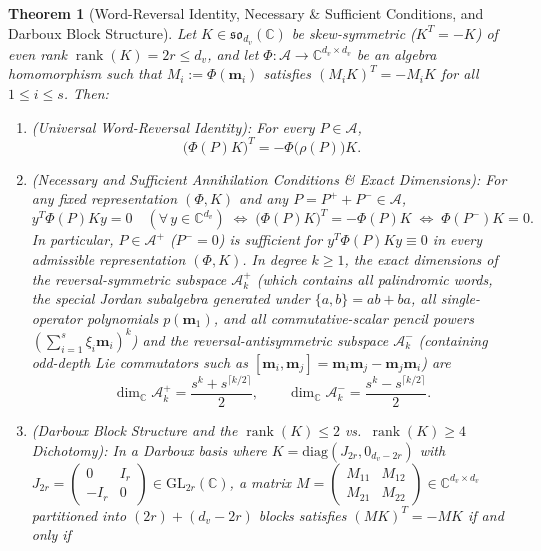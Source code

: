 \documentclass[11pt,a4paper]{article}
\newtheorem{theorem}{Theorem}[section]
\theoremstyle{definition}
\DeclareMathOperator{\rank}{rank}
\begin{document}
\begin{theorem}[Word-Reversal Identity, Necessary \& Sufficient Conditions, and Darboux Block Structure]\label{thm:wordreversal}
Let $K \in \mathfrak{so}_{d_v}(\mathbb{C})$ be skew-symmetric ($K^T = -K$) of even rank $\rank(K) = 2r \le d_v$, and let $\Phi : \mathcal{A} \to \mathbb{C}^{d_v \times d_v}$ be an algebra homomorphism such that $M_i := \Phi(\mathbf{m}_i)$ satisfies $(M_i K)^T = -M_i K$ for all $1 \le i \le s$. Then:
\begin{enumerate}
  \item \emph{(Universal Word-Reversal Identity):} For every $P \in \mathcal{A}$,
  \[
    \big(\Phi(P) K\big)^T = -\Phi\big(\rho(P)\big) K.
  \]
  \item \emph{(Necessary and Sufficient Annihilation Conditions \& Exact Dimensions):} For any fixed representation $(\Phi, K)$ and any $P = P^+ + P^- \in \mathcal{A}$,
  \[
    y^T \Phi(P) K y = 0 \quad (\forall\, y \in \mathbb{C}^{d_v})
    \;\Longleftrightarrow\;
    \big(\Phi(P) K\big)^T = -\Phi(P) K
    \;\Longleftrightarrow\;
    \Phi(P^-) K = 0.
  \]
  In particular, $P \in \mathcal{A}^+$ ($P^- = 0$) is sufficient for $y^T \Phi(P) K y \equiv 0$ in every admissible representation $(\Phi, K)$. In degree $k \ge 1$, the exact dimensions of the reversal-symmetric subspace $\mathcal{A}_k^+$ (which contains all palindromic words, the special Jordan subalgebra generated under $\{a,b\} = ab+ba$, all single-operator polynomials $p(\mathbf{m}_1)$, and all commutative-scalar pencil powers $(\sum_{i=1}^s \xi_i \mathbf{m}_i)^k$) and the reversal-antisymmetric subspace $\mathcal{A}_k^-$ (containing odd-depth Lie commutators such as $[\mathbf{m}_i, \mathbf{m}_j] = \mathbf{m}_i\mathbf{m}_j - \mathbf{m}_j\mathbf{m}_i$) are
  \[
    \dim_{\mathbb{C}} \mathcal{A}_k^+ = \frac{s^k + s^{\lceil k/2 \rceil}}{2},
    \qquad
    \dim_{\mathbb{C}} \mathcal{A}_k^- = \frac{s^k - s^{\lceil k/2 \rceil}}{2}.
  \]
  \item \emph{(Darboux Block Structure and the $\rank(K) \le 2$ vs.\ $\rank(K) \ge 4$ Dichotomy):} In a Darboux basis where $K = \mathrm{diag}(J_{2r}, 0_{d_v - 2r})$ with $J_{2r} = \left(\begin{smallmatrix} 0 & I_r \\ -I_r & 0 \end{smallmatrix}\right) \in \mathrm{GL}_{2r}(\mathbb{C})$, a matrix $M = \left(\begin{smallmatrix} M_{11} & M_{12} \\ M_{21} & M_{22} \end{smallmatrix}\right) \in \mathbb{C}^{d_v \times d_v}$ partitioned into $(2r) + (d_v - 2r)$ blocks satisfies $(MK)^T = -MK$ if and only if

\end{enumerate}
\end{theorem}
\end{document}
